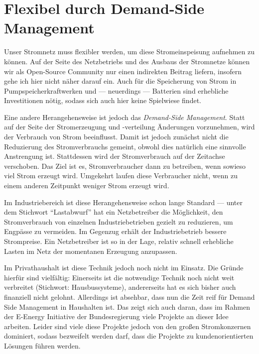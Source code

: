 \documentclass[12pt,BCOR=8.5mm]{scrartcl}
\begin{document}
\section{Flexibel durch Demand-Side Management}\label{sec:demand-side_management}

Unser Stromnetz muss flexibler werden, um diese Stromeinspeisung
aufnehmen zu können. Auf der Seite des Netzbetriebs und des Ausbaus der
Stromnetze können wir als Open-Source Community nur einen indirekten
Beitrag liefern, insofern gehe ich hier nicht näher darauf ein. Auch für
die Speicherung von Strom in Pumpspeicherkraftwerken und --- neuerdings
--- Batterien sind erhebliche Investitionen nötig, sodass sich auch hier
keine Spielwiese findet.

Eine andere Herangehensweise ist jedoch das \emph{Demand-Side
Management}. Statt auf der Seite der Stromerzeugung und -verteilung
Änderungen vorzunehmen, wird der Verbrauch von Strom beeinflusst. Damit
ist jedoch zunächst nicht die Reduzierung des Stromverbrauchs gemeint,
obwohl dies natürlich eine sinnvolle Anstrengung ist. Stattdessen wird
der Stromverbrauch auf der Zeitachse verschoben. Das Ziel ist es,
Stromverbraucher dann zu betreiben, wenn sowieso viel Strom erzeugt
wird. Umgekehrt laufen diese Verbraucher nicht, wenn zu einem anderen
Zeitpunkt weniger Strom erzeugt wird.

Im Industriebereich ist diese Herangehensweise schon lange Standard ---
unter dem Stichwort "`Lastabwurf"' hat ein Netzbetreiber die
Möglichkeit, den Stromverbrauch von einzelnen Industriebetrieben gezielt
zu reduzieren, um Engpässe zu vermeiden. Im Gegenzug erhält der
Industriebetrieb bessere Strompreise. Ein Netzbetreiber ist so in der
Lage, relativ schnell erhebliche Lasten im Netz der momentanen Erzeugung
anzupassen.

Im Privathaushalt ist diese Technik jedoch noch nicht im Einsatz. Die
Gründe hierfür sind vielfältig: Einerseits ist die notwendige Technik
noch nicht weit verbreitet (Stichwort: Hausbussysteme), andererseits hat
es sich bisher auch finanziell nicht gelohnt. Allerdings ist absehbar,
dass nun die Zeit reif für Demand Side Management in Haushalten ist. Das
zeigt sich auch daran, dass im Rahmen der E-Energy Initiative der
Bundesregierung viele Projekte an dieser Idee arbeiten. Leider sind viele diese Projekte jedoch von den großen
Stromkonzernen dominiert, sodass bezweifelt werden darf, dass die
Projekte zu kundenorientierten Lösungen führen werden. 
\end{document}
